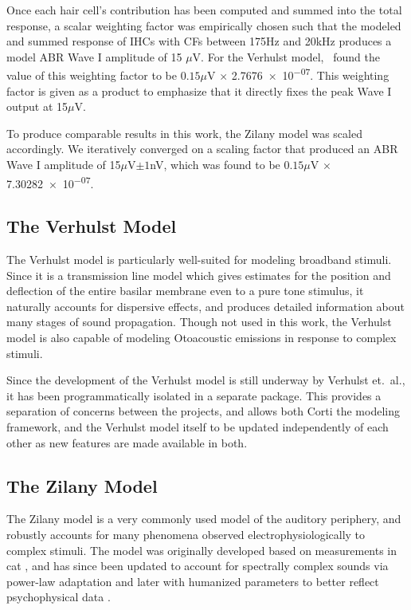 Once each hair cell's contribution has been computed and summed into the total response,  a scalar weighting factor was empirically chosen such that the modeled and summed response of IHCs with CFs between 175Hz and 20kHz produces a model ABR Wave I amplitude of 15 $\mu$V.  For the Verhulst model,~\cite{Verhulst2015Functional} found the value of this weighting factor to be $0.15\mu$V $\times$ \num{2.7676e-07}.  This weighting factor is given as a product to emphasize that it directly fixes the peak Wave I output at 15$\mu$V. 

To produce comparable results in this work, the Zilany model was scaled accordingly. We iteratively converged on a scaling factor that produced an ABR Wave I amplitude of 15$\mu$V$\pm 1$nV, which was found to be $0.15\mu$V $\times$ \num{7.30282e-07}.


\subsection{The Verhulst Model} %
\label{sub:the_verhulst_model1}
The Verhulst model is particularly well-suited for modeling broadband stimuli.  Since it is a transmission line model which gives estimates for the position and deflection of the entire basilar membrane even to a pure tone stimulus, it naturally accounts for dispersive effects, and produces detailed information about many stages of sound propagation. Though not used in this work, the Verhulst model is also capable of modeling Otoacoustic emissions in response to complex stimuli. 

Since the development of the Verhulst model is still underway by Verhulst et.~al., it has been programmatically isolated in a separate package.  This provides a separation of concerns between the projects, and allows both Corti the modeling framework, and the Verhulst model itself to be updated independently of each other as new features are made available in both.
\subsection{The Zilany Model} %
\label{sub:the_zilany_model}
The Zilany model is a very commonly used model of the auditory periphery, and robustly accounts for many phenomena observed electrophysiologically to complex stimuli.  The model was originally developed based on measurements in cat \citep{Zilany2006Modeling}, and has since been updated to account for spectrally complex sounds via power-law adaptation \citep{Zilany2007Predictions} and later with humanized parameters to better reflect psychophysical data \citep{Zilany2014Updated}. 

